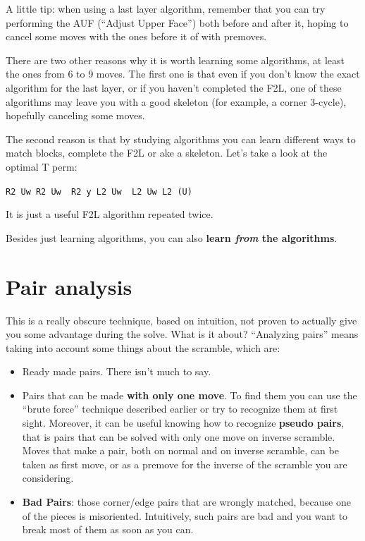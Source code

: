 \documentclass[11pt,a4paper]{book}
\newcommand{\p}{\textquotesingle}
\newcommand{\m}{\texttt}
\newcommand{\ps}{\p\,\,}
\begin{document}
A little tip: when using a last layer algorithm, remember that you can try performing the AUF (``Adjust Upper Face'') both before and after it, hoping to cancel some moves with the ones before it of with premoves.

There are two other reasons why it is worth learning some algorithms, at least the ones from 6 to 9 moves. The first one is that even if you don't know the exact algorithm for the last layer, or if you haven't completed the F2L, one of these algorithms may leave you with a good skeleton (for example, a corner 3-cycle), hopefully canceling some moves.

The second reason is that by studying algorithms you can learn different ways to match blocks, complete the F2L or ake a skeleton. Let's take a look at the optimal T perm:

\begin{center}
\m{R2 Uw R2 Uw\ps R2 y L2 Uw\ps L2 Uw L2 (U\p)}
\end{center}

It is just a useful F2L algorithm repeated twice.

Besides just learning algorithms, you can also \textbf{learn \emph{from} the algorithms}.

\section{Pair analysis}

This is a really obscure technique, based on intuition, not proven to actually give you some advantage during the solve. What is it about? ``Analyzing pairs'' means taking into account some things about the scramble, which are:

\begin{itemize}
\item Ready made pairs. There isn't much to say.
\item Pairs that can be made \textbf{with only one move}. To find them you can use the ``brute force'' technique described earlier or try to recognize them at first sight. Moreover, it can be useful knowing how to recognize \textbf{pseudo pairs}, that is pairs that can be solved with only one move on inverse scramble. Moves that make a pair, both on normal and on inverse scramble, can be taken as first move, or as a premove for the inverse of the scramble you are considering.
\item \textbf{Bad Pairs}: those corner/edge pairs that are wrongly matched, because one of the pieces is misoriented. Intuitively, such pairs are bad and you want to break most of them as soon as you can.
\end{itemize}
\end{document}
